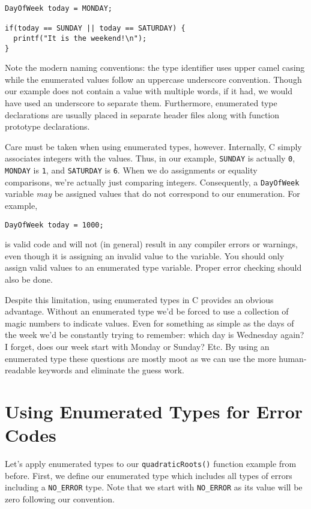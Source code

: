 \begin{verbatim}
DayOfWeek today = MONDAY;

if(today == SUNDAY || today == SATURDAY) {
  printf("It is the weekend!\n");
}
\end{verbatim}

Note the modern naming conventions: the type identifier uses 
upper camel casing while the enumerated values follow an 
uppercase underscore convention.  Though our example does
not contain a value with multiple words, if it had, we would have
used an underscore to separate them.  Furthermore, enumerated
type declarations are usually placed in separate header files
along with function prototype declarations.  

Care must be taken when using enumerated types, however.  
Internally, C simply associates integers with the values.  Thus, 
in our example, \texttt{SUNDAY} is actually \texttt{0}, 
\texttt{MONDAY} is \texttt{1}, and 
\texttt{SATURDAY} is \texttt{6}.  When we do
assignments or equality comparisons, we're actually just
comparing integers.  Consequently, a \texttt{DayOfWeek} 
variable \emph{may}
be assigned values that do not correspond to our enumeration. 
For example, 

\texttt{DayOfWeek today = 1000;}

is valid code and will not (in general) result in any compiler errors
or warnings, even though it is assigning an invalid value to the 
variable.  You should only assign valid values to an
enumerated type variable.  Proper error checking should also
be done.

Despite this limitation, using enumerated types in C provides an
obvious advantage.  Without an enumerated type we'd be forced
to use a collection of \glspl{magic number} to indicate values.  
Even for something as simple as the days of the week we'd be
constantly trying to remember: which day is Wednesday again?
I forget, does our week start with Monday or Sunday?  Etc.  By
using an enumerated type these questions are mostly moot as
we can use the more human-readable keywords and eliminate
the guess work.

\section{Using Enumerated Types for Error Codes}

Let's apply enumerated types to our \texttt{quadraticRoots()}
function example from before.  First, we define our enumerated
type which includes all types of errors including a \texttt{NO_ERROR}
type.  Note that we start with \texttt{NO_ERROR} as its value
will be zero following our convention.

